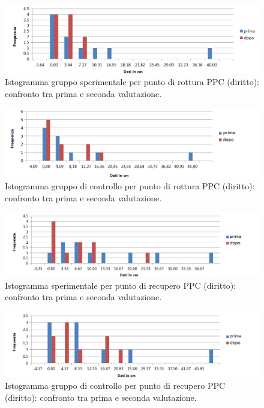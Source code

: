 \begin{figure}[h!]
	\centering
	\includegraphics[scale=0.37]{source/grafici/PPC_DIRITTO_DEFINITIVO_sperimentale.png}
	\caption[Istogramma gruppo sperimentale per punto di rottura PPC (diritto)]{Istogramma gruppo sperimentale per punto di rottura PPC (diritto): confronto tra prima e seconda valutazione.}
	\label{fig:issuexample}
\end{figure}
 \begin{figure}[h!]
	\centering
	\includegraphics[scale=0.37]{source/grafici/PPC_DIRITTO_DEFINITIVO_GRUPPO_CONTROLLO.png}
	\caption[Istogramma gruppo di controllo per punto di rottura PPC (diritto)]{Istogramma gruppo di controllo per punto di rottura PPC (diritto): confronto tra prima e seconda valutazione.}
	\label{fig:issuexample}
\end{figure}
 \begin{figure}[h!]
	\centering
	\includegraphics[scale=0.37]{source/grafici/Recupero_PPC_diritto_Trattati.png}
	\caption[Istogramma  sperimentale per punto di recupero PPC (diritto)]{Istogramma  sperimentale per punto di recupero PPC (diritto): confronto tra prima e seconda valutazione.}
	\label{fig:issuexample}
\end{figure}
 \begin{figure}[h!]
	\centering
	\includegraphics[scale=0.37]{source/grafici/Recupero_PPC_diritto_Non_Trattati.png}
	\caption[Istogramma gruppo di controllo per punto di recupero PPC (diritto)]{Istogramma gruppo di controllo per punto di recupero PPC (diritto): confronto tra prima e seconda valutazione.}
	\label{fig:issuexample}
\end{figure}
\\\ 
